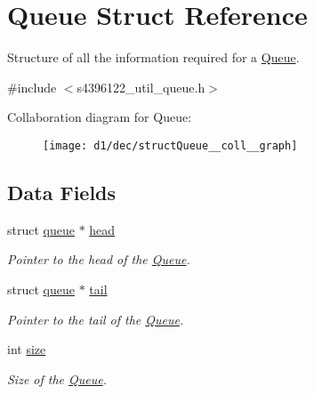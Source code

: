 \hypertarget{structQueue}{}\section{Queue Struct Reference}
\label{structQueue}


Structure of all the information required for a \hyperlink{structQueue}{Queue}.  




{\ttfamily \#include $<$s4396122\+\_\+util\+\_\+queue.\+h$>$}



Collaboration diagram for Queue\+:\nopagebreak
\begin{figure}[H]
\begin{center}
\leavevmode
\texttt{[image: d1/dec/structQueue\_\_coll\_\_graph]}
\end{center}
\end{figure}
\subsection*{Data Fields}
\begin{DoxyCompactItemize}
\item 
struct \hyperlink{structqueue}{queue} $\ast$ \hyperlink{structQueue_a64cfeab728b5d35d15859a6441ef0a35}{head}\hypertarget{structQueue_a64cfeab728b5d35d15859a6441ef0a35}{}\label{structQueue_a64cfeab728b5d35d15859a6441ef0a35}

\begin{DoxyCompactList}\small\item\em Pointer to the head of the \hyperlink{structQueue}{Queue}. \end{DoxyCompactList}\item 
struct \hyperlink{structqueue}{queue} $\ast$ \hyperlink{structQueue_a3c273fad6555af394c06265aca0c6270}{tail}\hypertarget{structQueue_a3c273fad6555af394c06265aca0c6270}{}\label{structQueue_a3c273fad6555af394c06265aca0c6270}

\begin{DoxyCompactList}\small\item\em Pointer to the tail of the \hyperlink{structQueue}{Queue}. \end{DoxyCompactList}\item 
int \hyperlink{structQueue_ac7d9701d244e3ba255ef8556e0562dc6}{size}\hypertarget{structQueue_ac7d9701d244e3ba255ef8556e0562dc6}{}\label{structQueue_ac7d9701d244e3ba255ef8556e0562dc6}

\begin{DoxyCompactList}\small\item\em Size of the \hyperlink{structQueue}{Queue}. \end{DoxyCompactList}\end{DoxyCompactItemize}


